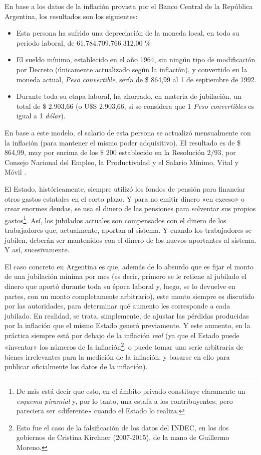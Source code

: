 \documentclass[12pt,a4paper,twoside]{book}
\begin{document}
En base a los datos de la inflación provista por el Banco Central de la República Argentina, los resultados son los siguientes:

\begin{itemize}
\item Esta persona ha sufrido una depreciación de la moneda local, en todo su período laboral, de 61.784.709.766.312,00 \%
\item El sueldo mínimo, establecido en el año 1964, sin ningún tipo de modificación por Decreto (únicamente actualizado según la inflación), y convertido en la moneda actual, \textit{Peso convertible}, sería de \$ 864,99 al 1 de septiembre de 1992.
\item Durante toda su etapa laboral, ha ahorrado, en materia de jubilación, un total de \$ 2.903,66 (o U\$S 2.903,66, si se considera que 1 \textit{Peso convertibles} es igual a 1 \textit{dólar}).
\end{itemize}

En base a este modelo, el salario de esta persona se actualizó mensualmente con la inflación (para mantener el mismo poder adquisitivo). El resultado es de \$ 864,99, muy por encima de los \$ 200 establecido en la Resolución 2/93, por Consejo Nacional del Empleo, la Productividad y el Salario Mínimo, Vital y Móvil \cite{res:2-93}.

El Estado, históricamente, siempre utilizó los fondos de pensión para financiar otros gastos estatales en el corto plazo. Y para no emitir dinero «en exceso» o crear enormes deudas, se usa el dinero de las pensiones para solventar sus propios gastos\footnote{De más está decir que esto, en el ámbito privado constituye claramente un \textit{esquema piramial} y, por lo tanto, una estafa a los contribuyentes; pero pareciera ser «diferente» cuando el Estado lo realiza.}. Así, los jubilados actuales son compensados con el dinero de los trabajadores que, actualmente, aportan al sistema. Y cuando los trabajadores se jubilen, deberán ser mantenidos con el dinero de los nuevos aportantes al sistema. Y así, sucesivamente.

El caso concreto en Argentina es que, además de lo absurdo que es fijar el monto de una jubilación mínima por mes (es decir, primero se le retiene al jubilado el dinero que aportó durante toda su época laboral y, luego, se lo devuelve en partes, con un monto completamente arbitrario), este monto siempre es discutido por las autoridades, para determinar qué aumento les corresponde a cada jubilado. En realidad, se trata, simplemente, de ajustar las pérdidas producidas por la inflación que el mismo Estado generó previamente. Y este aumento, en la práctica siempre está por debajo de la inflación \textit{real} (ya que el Estado puede «inventar» los números de la inflación\footnote{Esto fue el caso de la falsificación de los datos del INDEC, en los dos gobiernos de Cristina Kirchner (2007-2015), de la mano de Guillermo Moreno.}, o puede tomar una serie arbitraria de bienes irrelevantes para la medición de la inflación, y basarse en ello para publicar oficialmente los datos de la inflación).
\end{document}
